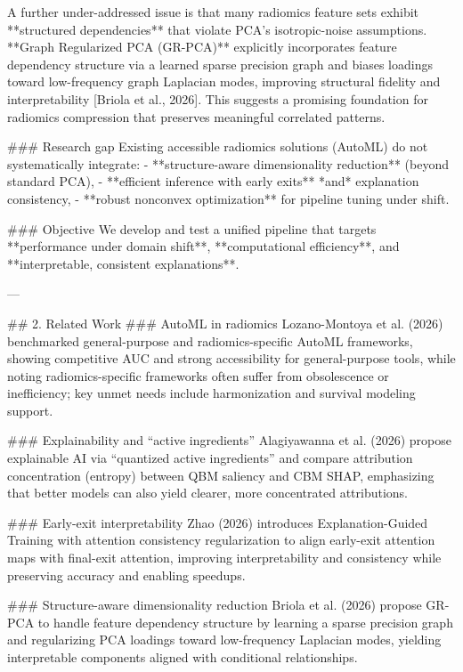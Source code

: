 A further under-addressed issue is that many radiomics feature sets exhibit **structured dependencies** that violate PCA’s isotropic-noise assumptions. **Graph Regularized PCA (GR-PCA)** explicitly incorporates feature dependency structure via a learned sparse precision graph and biases loadings toward low-frequency graph Laplacian modes, improving structural fidelity and interpretability [Briola et al., 2026]. This suggests a promising foundation for radiomics compression that preserves meaningful correlated patterns.

### Research gap
Existing accessible radiomics solutions (AutoML) do not systematically integrate:
- **structure-aware dimensionality reduction** (beyond standard PCA),
- **efficient inference with early exits** *and* explanation consistency,
- **robust nonconvex optimization** for pipeline tuning under shift.

### Objective
We develop and test a unified pipeline that targets **performance under domain shift**, **computational efficiency**, and **interpretable, consistent explanations**.

---

## 2. Related Work
### AutoML in radiomics
Lozano-Montoya et al. (2026) benchmarked general-purpose and radiomics-specific AutoML frameworks, showing competitive AUC and strong accessibility for general-purpose tools, while noting radiomics-specific frameworks often suffer from obsolescence or inefficiency; key unmet needs include harmonization and survival modeling support.

### Explainability and “active ingredients”
Alagiyawanna et al. (2026) propose explainable AI via “quantized active ingredients” and compare attribution concentration (entropy) between QBM saliency and CBM SHAP, emphasizing that better models can also yield clearer, more concentrated attributions.

### Early-exit interpretability
Zhao (2026) introduces Explanation-Guided Training with attention consistency regularization to align early-exit attention maps with final-exit attention, improving interpretability and consistency while preserving accuracy and enabling speedups.

### Structure-aware dimensionality reduction
Briola et al. (2026) propose GR-PCA to handle feature dependency structure by learning a sparse precision graph and regularizing PCA loadings toward low-frequency Laplacian modes, yielding interpretable components aligned with conditional relationships.

